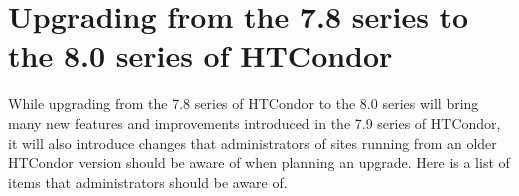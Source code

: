 \section{\label{sec:to-8.0}Upgrading from the 7.8 series to the 8.0 series of HTCondor}

While upgrading from the 7.8 series of HTCondor to the 8.0 series 
will bring many
new features and improvements introduced in the 7.9 series of HTCondor,
it will
also introduce changes that administrators of sites running from an older
HTCondor version should be aware of when planning an upgrade.  
Here is a list of items that administrators should be aware of.

